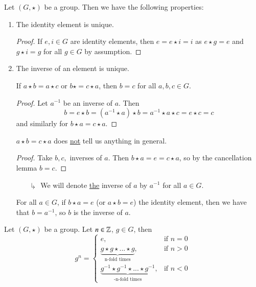 \begin{prop}
    Let $(G,\star)$ be a group. Then we have the following properties:
    \begin{enumerate}
        \item The identity element is unique.
        \begin{proof}
            If $e,i \in G$ are identity elements, then $e = e\star i = i$ as $e \star g = e$ and $g \star i = g$ for all $g \in G$ by assumption.
        \end{proof}
        \item The inverse of an element is unique.
        \begin{lem}
            If $a \star b = a \star c$ or $b \star = c \star a$, then $b = c$ for all $a,b,c \in G$. 
        \end{lem}
        \begin{proof}
            Let $a^{-1}$ be an inverse of $a$. Then $$b = e\star b = (a^{-1} \star a) \star b = a^{-1} \star a \star c = e \star c = c$$ and similarly for $b \star a = c \star a$.
        \end{proof}
        \begin{rmk}
            $a \star b = c \star a$ does \underline{not} tell us anything in general.
        \end{rmk}
        \begin{proof}
            Take $b,c,$ inverses of $a$. Then $b \star a = e = c \star a$, so by the cancellation lemma $b = c$.
        \end{proof}
        \begin{enumerate}
            \item[$\drsh$] We will denote \underline{the} inverse of $a$ by $a^{-1}$ for all $a \in G$. 
        \end{enumerate}
        \begin{cor}
            For all $a \in G$, if $b \star a = e$ (or $a \star b = e$) the identity element, then we have that $b = a^{-1}$, so $b$ is the inverse of $a$.
        \end{cor}
    \end{enumerate}
\end{prop}


\begin{defn}
    Let $(G, \star)$ be a group. Let $n \in \mathbb Z$, $g \in G$, then \begin{equation}
        g^n = \left\{\begin{array}{ll} e, & \text{if } n = 0 \\ \underbrace{g\star g \star ... \star g}_{\text{n-fold times}}, & \text{if } n > 0 \\ \underbrace{g^{-1}\star g^{-1} \star ... \star g^{-1}}_{\text{-n-fold times}}, & \text{if } n < 0\end{array}\right.
    \end{equation}
\end{defn}

